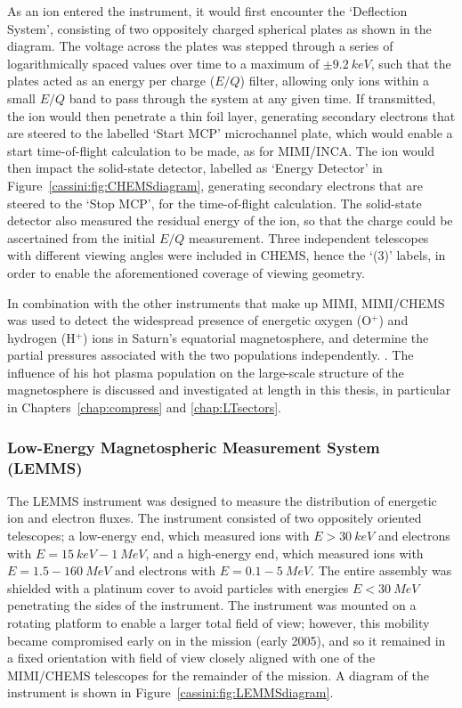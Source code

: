 As an ion entered the instrument, it would first encounter the `Deflection System', consisting of two oppositely charged spherical plates as shown in the diagram. The voltage across the plates was stepped through a series of logarithmically spaced  values over time to a maximum  of $\pm\SI{9.2}{keV}$, such that the plates acted as an energy per charge ($E/Q$) filter, allowing only ions within a small $E/Q$ band to pass through the system at any given time. If transmitted, the ion would then penetrate a thin foil layer, generating  secondary electrons that are  steered to the labelled `Start MCP' microchannel plate, which would enable a start time-of-flight calculation to be made, as for MIMI/INCA. The ion would then impact the solid-state detector, labelled as `Energy Detector' in Figure~\ref{cassini:fig:CHEMSdiagram}, generating  secondary electrons that are steered to the `Stop MCP',  for the time-of-flight calculation. The solid-state detector also measured the residual energy of the ion, so that the charge could be ascertained from the initial $E/Q$ measurement. Three independent telescopes with different viewing angles were included in CHEMS, hence the `(3)' labels, in order to enable the  aforementioned coverage of viewing geometry.

In combination with the other instruments that make up MIMI, MIMI/CHEMS was used to detect the widespread presence of energetic oxygen (O$^+$) and hydrogen (H$^+$) ions in Saturn's equatorial magnetosphere, and determine the partial pressures associated with the two populations independently. \citep[e.g.][]{sergis2009}. The influence of his hot plasma population on  the large-scale structure of the magnetosphere is discussed and investigated at length in this  thesis, in particular in Chapters~\ref{chap:compress} and \ref{chap:LTsectors}.

\subsubsection{Low-Energy Magnetospheric Measurement System (LEMMS)}
The LEMMS instrument was designed to measure the distribution of energetic ion and electron fluxes. The instrument consisted of two oppositely oriented telescopes; a low-energy end, which measured ions with $E>\SI{30}{keV}$ and electrons with $E=\SI{15}{keV}{-}\SI{1}{MeV}$, and a high-energy  end, which measured  ions with $E=1.5-\SI{160}{MeV}$ and electrons with $E=0.1{-}\SI{5}{MeV}$. The entire assembly was shielded with a platinum cover to avoid particles with energies $E<\SI{30}{MeV}$ penetrating the sides of the instrument. The instrument  was mounted on  a rotating platform  to enable a larger total field of view; however, this mobility became compromised early on in the mission (early 2005), and so it remained in a fixed orientation with field of view closely aligned with one of the MIMI/CHEMS telescopes for the remainder of  the mission. A diagram of the instrument is shown in Figure~\ref{cassini:fig:LEMMSdiagram}.

